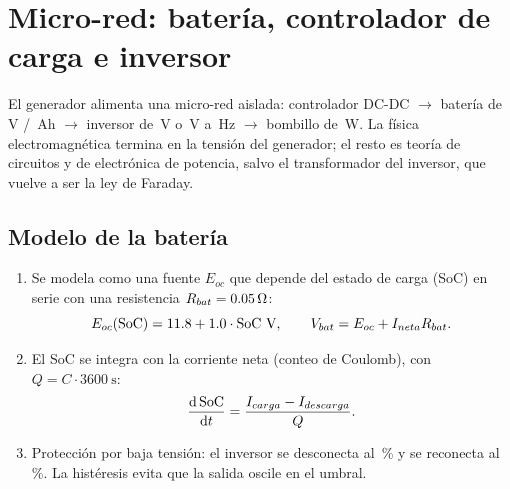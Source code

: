 \documentclass[11pt]{article}
\begin{document}
\section{Micro-red: batería, controlador de carga e inversor}
El generador alimenta una micro-red aislada: controlador DC-DC $\rightarrow$ batería de
\ValBateriaTension\,V / \ValBateriaCapacidad\,Ah $\rightarrow$ inversor de \ValInversorTension\,V o
\ValInversorTensionAlta\,V a \ValInversorFrecuencia\,Hz $\rightarrow$ bombillo de \ValPotenciaCargaAc\,W.
La física electromagnética termina en la tensión del generador; el resto es teoría de circuitos y de
electrónica de potencia, salvo el transformador del inversor, que vuelve a ser la ley de Faraday.

\subsection{Modelo de la batería}
\begin{enumerate}
  \item Se modela como una fuente $E_{oc}$ que depende del estado de carga (SoC) en serie con una resistencia
        $R_{bat}=0.05\,\Omega$:
        \begin{equation}
          E_{oc}(\text{SoC})=\ValBateriaVacia+\ValBateriaPendiente\cdot\text{SoC}\ \text{V},\qquad
          V_{bat}=E_{oc}+I_{neta}R_{bat}.
        \end{equation}
  \item El SoC se integra con la corriente neta (conteo de Coulomb), con $Q=C\cdot\SI{3600}{\second}$:
        \begin{equation}
          \frac{\mathrm{d}\,\text{SoC}}{\mathrm{d} t}=\frac{I_{carga}-I_{descarga}}{Q}.
        \end{equation}
  \item Protección por baja tensión: el inversor se desconecta al \ValSocCorte\,\% y se reconecta al
        \ValSocReconexion\,\%. La histéresis evita que la salida oscile en el umbral.
\end{enumerate}
\end{document}
